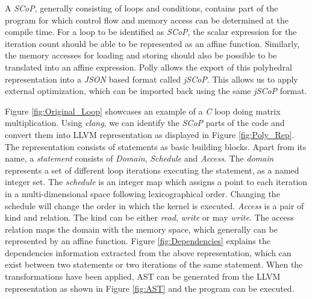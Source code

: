 \documentclass[logo,msc]{infthesis}           %
\begin{document}
A \textit{SCoP}, generally consisting of loops and conditions, contains part of the program for which control flow and memory access can be determined at the compile time. For a loop to be identified as \textit{SCoP}, the scalar expression for the iteration count should be able to be represented as an affine function. Similarly, the memory accesses for loading and storing should also be possible to be translated into an affine expression. Polly allows the export of this polyhedral representation into a \textit{JSON} based format called \textit{jSCoP}.
This allows us to apply external optimization, which can be imported back using the same \textit{jSCoP} format.

 Figure \ref{fig:Original_Loop} showcases an example of a \textit{C} loop doing matrix multiplication. Using \textit{clang}, we can identify the \textit{SCoP} parts of the code and convert them into LLVM representation as displayed in Figure \ref{fig:Poly_Rep}. The representation consists of statements as basic building blocks. Apart from its name, a \textit{statement} consists of \textit{Domain}, \textit{Schedule} and \textit{Access}. The \textit{domain} represents a set of different loop iterations executing the statement, as a named integer set. The \textit{schedule} is an integer map which assigns a point to each iteration in a multi-dimensional space following lexicographical order. Changing the schedule will change the order in which the kernel is executed. \textit{Access} is a pair of kind and relation. The kind can be either \textit{read}, \textit{write} or may \textit{write}. The access relation maps the domain with the memory space, which generally can be represented by an affine function. Figure \ref{fig:Dependencies} explains the dependencies information extracted from the above representation, which can exist between two statements or two iterations of the same statement. When the transformations have been applied, AST can be generated from the LLVM representation as shown in Figure \ref{fig:AST} and the program can be executed.
 
\end{document}
